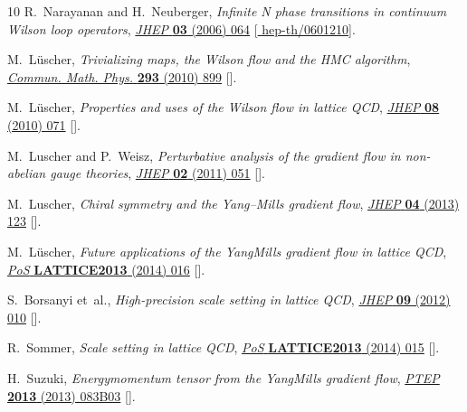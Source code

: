 \begin{thebibliography}{10}
R.~Narayanan and H.~Neuberger, \emph{{Infinite N phase transitions in continuum
  Wilson loop operators}},
  \href{https://doi.org/10.1088/1126-6708/2006/03/064}{\emph{JHEP} {\bfseries
  03} (2006) 064} [\href{https://arxiv.org/abs/hep-th/0601210}{{\ttfamily
  hep-th/0601210}}].

M.~L{\"u}scher, \emph{{Trivializing maps, the Wilson flow and the HMC
  algorithm}}, \href{https://doi.org/10.1007/s00220-009-0953-7}{\emph{Commun.
  Math. Phys.} {\bfseries 293} (2010) 899}
  [\href{https://arxiv.org/abs/0907.5491}{{}}].

M.~L\"uscher, \emph{{Properties and uses of the Wilson flow in lattice QCD}},
  \href{https://doi.org/10.1007/JHEP08(2010)071}{\emph{JHEP} {\bfseries 08}
  (2010) 071} [\href{https://arxiv.org/abs/1006.4518}{{}}].

M.~Luscher and P.~Weisz, \emph{{Perturbative analysis of the gradient flow in
  non-abelian gauge theories}},
  \href{https://doi.org/10.1007/JHEP02(2011)051}{\emph{JHEP} {\bfseries 02}
  (2011) 051} [\href{https://arxiv.org/abs/1101.0963}{{}}].

M.~Luscher, \emph{{Chiral symmetry and the Yang--Mills gradient flow}},
  \href{https://doi.org/10.1007/JHEP04(2013)123}{\emph{JHEP} {\bfseries 04}
  (2013) 123} [\href{https://arxiv.org/abs/1302.5246}{{}}].

M.~L\"uscher, \emph{{Future applications of the Yang\textendash{}Mills gradient
  flow in lattice QCD}}, \href{https://doi.org/10.22323/1.187.0016}{\emph{PoS}
  {\bfseries LATTICE2013} (2014) 016}
  [\href{https://arxiv.org/abs/1308.5598}{{}}].

S.~Borsanyi et~al., \emph{{High-precision scale setting in lattice QCD}},
  \href{https://doi.org/10.1007/JHEP09(2012)010}{\emph{JHEP} {\bfseries 09}
  (2012) 010} [\href{https://arxiv.org/abs/1203.4469}{{}}].

R.~Sommer, \emph{{Scale setting in lattice QCD}},
  \href{https://doi.org/10.22323/1.187.0015}{\emph{PoS} {\bfseries LATTICE2013}
  (2014) 015} [\href{https://arxiv.org/abs/1401.3270}{{}}].

H.~Suzuki, \emph{{Energy\textendash{}momentum tensor from the
  Yang\textendash{}Mills gradient flow}},
  \href{https://doi.org/10.1093/ptep/ptt059}{\emph{PTEP} {\bfseries 2013}
  (2013) 083B03} [\href{https://arxiv.org/abs/1304.0533}{{}}].


\end{thebibliography}
